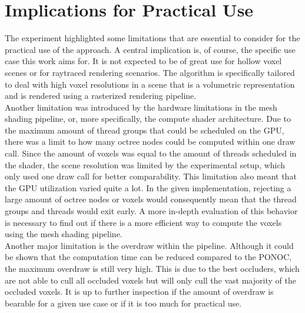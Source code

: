 \section{Implications for Practical Use}

The experiment highlighted some limitations that are essential to consider for the practical use of the approach. 
A central implication is, of course, the specific use case this work aims for. It is not expected to be of great use 
for hollow voxel scenes or for raytraced rendering scenarios. The algorithm is specifically tailored to deal with 
high voxel resolutions in a scene that is a volumetric representation and is rendered using a rasterized rendering 
pipeline. \\

\noindent
Another limitation was introduced by the hardware limitations in the mesh shading pipeline, or, more specifically, the 
compute shader architecture. Due to the maximum amount of thread groups that could be scheduled on the \ac{GPU}, there 
was a limit to how many octree nodes could be computed within one draw call. Since the amount of voxels was equal to the 
amount of threads scheduled in the shader, the scene resolution was limited by the experimental setup, which only used 
one draw call for better comparability. This limitation also meant that the \ac{GPU} utilization varied quite a lot. 
In the given implementation, rejecting a large amount of octree nodes or voxels would consequently mean that the thread 
groups and threads would exit early. A more in-depth evaluation of this behavior is necessary to find out if there is a 
more efficient way to compute the voxels using the mesh shading pipeline. \\

\noindent
Another major limitation is the overdraw within the pipeline. Although it could be shown that the computation time 
can be reduced compared to the \ac{PONOC}, the maximum overdraw is still very high. This is due to the best occluders, 
which are not able to cull all occluded voxels but will only cull the vast majority of the occluded voxels. It is up 
to further inspection if the amount of overdraw is bearable for a given use case or if it is too much for practical 
use. \\

